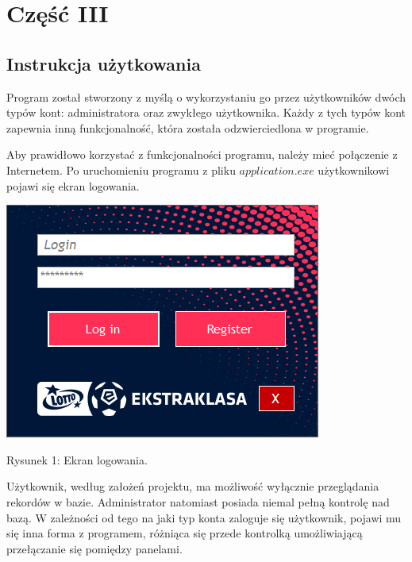 \documentclass[12pt,a4paper]{article}
\begin{document}
    \newpage
    \section{Część III}
    \subsection{Instrukcja użytkowania}
    Program został stworzony z myślą o wykorzystaniu go przez użytkowników dwóch typów kont: administratora oraz zwykłego użytkownika. Każdy z tych typów kont zapewnia inną funkcjonalność, która została odzwierciedlona w programie.
    
    Aby prawidłowo korzystać z funkcjonalności programu, należy mieć połączenie z Internetem. Po uruchomieniu programu z pliku $application.exe$ użytkownikowi pojawi się ekran logowania.
    
    \begin{center}
        \includegraphics[scale=1]{login-panel.png}
        \begin{flushleft}
            \begin{scriptsize}
            \begin{list}{}{\leftmargin=21.5em}\raggedright\item\relax
            Rysunek 1: Ekran logowania.
            \end{list}
            \end{scriptsize}
        \end{flushleft}
    \end{center}
    
    Użytkownik, według założeń projektu, ma możliwość wyłącznie przeglądania rekordów w bazie. Administrator natomiast posiada niemal pełną kontrolę nad bazą. W zależności od tego na jaki typ konta zaloguje się użytkownik, pojawi mu się inna forma z programem, różniąca się przede kontrolką umożliwiającą przełączanie się pomiędzy panelami.
    
\end{document}

